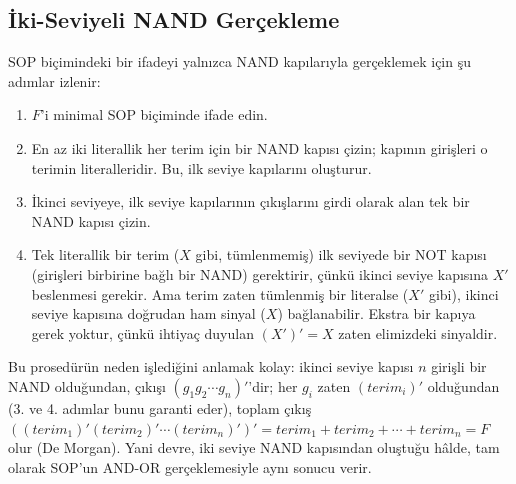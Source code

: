 \subsection{İki-Seviyeli NAND Gerçekleme}\label{sec:nandnor-iki-seviyeli-nand}
SOP biçimindeki bir ifadeyi yalnızca NAND kapılarıyla gerçeklemek için şu adımlar izlenir:
\begin{enumerate}[nosep, leftmargin=*]
    \item $F$'i minimal SOP biçiminde ifade edin.
    \item En az iki literallik her terim için bir NAND kapısı çizin; kapının girişleri o
    terimin literalleridir. Bu, ilk seviye kapılarını oluşturur.
    \item İkinci seviyeye, ilk seviye kapılarının çıkışlarını girdi olarak alan tek bir
    NAND kapısı çizin.
    \item Tek literallik bir terim ($X$ gibi, tümlenmemiş) ilk seviyede bir NOT kapısı
    (girişleri birbirine bağlı bir NAND) gerektirir, çünkü ikinci seviye kapısına $X'$
    beslenmesi gerekir. Ama terim zaten tümlenmiş bir literalse ($X'$ gibi), ikinci
    seviye kapısına doğrudan ham sinyal ($X$) bağlanabilir. Ekstra bir kapıya gerek
    yoktur, çünkü ihtiyaç duyulan $(X')'=X$ zaten elimizdeki sinyaldir.
\end{enumerate}
Bu prosedürün neden işlediğini anlamak kolay: ikinci seviye kapısı $n$ girişli bir NAND
olduğundan, çıkışı $(g_1 g_2 \cdots g_n)'$'dir; her $g_i$ zaten $(terim_i)'$ olduğundan
(3. ve 4. adımlar bunu garanti eder), toplam çıkış
$((terim_1)'(terim_2)'\cdots(terim_n)')'=terim_1+terim_2+\cdots+terim_n=F$ olur (De
Morgan). Yani devre, iki seviye NAND kapısından oluştuğu hâlde, tam olarak SOP'un
AND-OR gerçeklemesiyle aynı sonucu verir.

